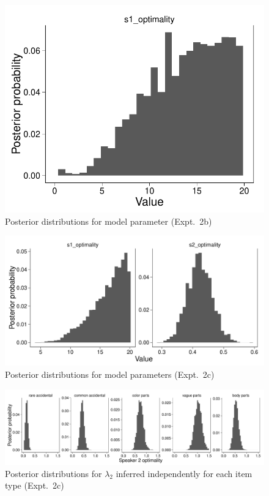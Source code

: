 \documentclass[12pt,letterpaper]{article}
\begin{document}
\begin{figure}[h]
\centering
    \includegraphics[width=0.6\columnwidth]
    {unfamiliar-interpretations-parameter.pdf}
    \caption{
    Posterior distributions for model parameter (Expt.~2b)
}
  \label{fig:interpretation-param}
\end{figure}

\begin{figure}[h]
\centering
    \includegraphics[width=\columnwidth]
    {unfamiliar-asymmetry-parameters.pdf}
    \caption{
    Posterior distributions for model parameters (Expt.~2c)
}
  \label{fig:asymmetry-params}
\end{figure}

\begin{figure}[h]
\centering
    \includegraphics[width=\columnwidth]
    {unfamiliar-asymmetry-byItem-parameters.pdf}
    \caption{
    Posterior distributions for $\lambda_2$ inferred independently for each item type (Expt.~2c)
}
  \label{fig:asymmetry-params-byItem}
\end{figure}
\end{document}
